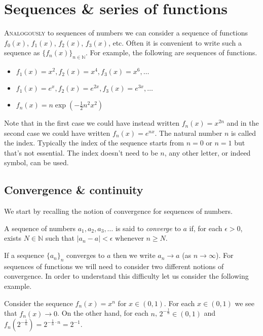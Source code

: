 \chapter{Sequences \& series of functions}
\bookletstart

\lettrine{A}{nalogously} to sequences of numbers we can consider a sequence of functions \(f_0(x)\), \(f_1(x)\), \(f_2(x)\), \(f_3(x)\), etc.
Often it is convenient to write such a sequence as \({\{ f_n(x)\}}_{n\in \mathbb{N}}\).
For example, the following are sequences of functions.
\begin{itemize}
  \item \(f_1(x) = x^2, f_2(x)=x^4, f_3(x)=x^6,\ldots \)
  \item \(f_1(x) = e^x, f_2(x)=e^{2x}, f_3(x)=e^{3x},\ldots \)
  \item \(f_n(x) = n \exp \left( - \frac{1}{2}n^2 x^2 \right)\)
\end{itemize}

Note that in the first case we could have instead written \(f_n(x) = x^{2n}\) and in the second case we could have written  \(f_n(x) = e^{nx}\).
The natural number \(n\) is called the index.
Typically the index of the sequence starts from \(n=0\) or \(n=1\) but that's not essential.
The index doesn't need to be \(n\), any other letter, or indeed symbol, can be used.


\section{Convergence \& continuity}

We start by recalling the notion of convergence for sequences of numbers.

\begin{definition}
  A sequence of numbers  \(a_1, a_2, a_3,\ldots \) is said to \emph{converge} to \(a\) if, for each \(\epsilon>0\), exists \(N\in \mathbb{N}\) such that \(|a_n - a| < \epsilon\) whenever \(n\geq N\).
\end{definition}
%
\noindent
If a sequence \({\{a_n\}}_{n}\) converges to \(a\) then we write \(a_n \to a\) (as \(n\to \infty\)).
For sequences of functions we will need to consider two different notions of convergence.
In order to understand this difficulty let us consider the following example.

\begin{example*}
  Consider the sequence \(f_n(x) = x^n\) for \(x\in (0,1)\).
  For each \(x\in (0,1)\) we see that \(f_n(x) \to 0\).
  On the other hand, for each \(n\), \(2^{-\frac{1}{n}}\in (0,1)\) and \(f_n(2^{-\frac{1}{n}}) = 2^{-\frac{1}{n}\cdot n} = 2^{-1}\).
\end{example*}


